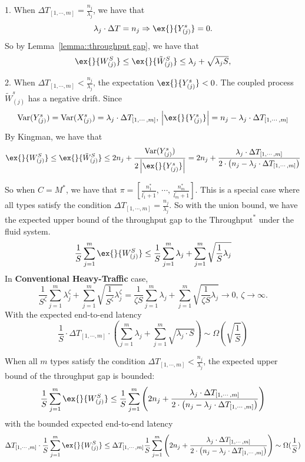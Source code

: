 \documentclass[preprint]{article}
\theoremstyle{plain}
\theoremstyle{definition}
\theoremstyle{remark}
\begin{document}
1. When $ \Delta T_{[1,\cdots,m]} = \frac{n_j}{\lambda_j}$, we have that
$$\lambda_j\cdot \Delta T = n_j\Rightarrow \ex{}{Y^s_{(j)}}=0.$$
So by Lemma~\ref{lemma::throughput gap}, we have that
$$\ex{}{W^S_{(j)}}\leq \ex{}{\tilde{W}^S_{(j)}}\leq \lambda_j + \sqrt{\lambda_j S}, $$

2. When $\Delta T_{[1,\cdots,m]} < \frac{n_j}{\lambda_j}$, the expectation $\ex{}{Y^s_{(j)}}<0$. The coupled process $\tilde{W}^s_{(j)}$ has a negative drift. Since
$$\text{Var}(Y^s_{(j)} )= \text{Var}(X^s_{(j)} )  = \lambda_j \cdot \Delta T_{[1,\cdots,m]},\,
\left| \ex{}{Y^s_{(j)}} \right| = n_j - \lambda_j\cdot \Delta T_{[1,\cdots,m]}$$
By Kingman, we have that
$$\ex{}{W^S_{(j)}}\leq \ex{}{\tilde{W}^S_{(j)}}\leq 2n_j + \frac{\text{Var}(Y^s_{(j)} )}{2\left| \ex{}{Y^s_{(j)}} \right| } =2n_j+ \frac{\lambda_j \cdot \Delta T_{[1,\cdots,m]}}{2\cdot\left(n_j - \lambda_j\cdot \Delta T_{[1,\cdots,m]}\right)}$$

So when $C = M^*$, we have that $\pi = [\frac{n_1^*}{l_1^\prime+1},\,\cdots,\, \frac{n_m^*}{l_m^\prime+1}]$. This is a special case where all types satisfy the condition $\Delta T_{[1,\cdots,m]} = \frac{n_j}{\lambda_j}$. So with the union bound, we have the expected upper bound of the throughput gap to the $\text{Throughput}^*$ under the fluid system.
$$\frac{1}{S}\sum_{j=1}^m \ex{}{W^S_{(j)}}\leq \frac{1}{S}\sum_{j=1}^m \lambda_j +\sum_{j=1}^m \sqrt{\frac{1}{S}\lambda_j} $$
In \textbf{Conventional Heavy-Traffic} case,
$$\frac{1}{S^{\zeta }}\sum_{j=1}^m \lambda_j^{\zeta } +\sum_{j=1}^m \sqrt{\frac{1}{S^{\zeta }}\lambda_j^{\zeta }}  =\frac{1}{\zeta S}\sum_{j=1}^m \lambda_j +\sum_{j=1}^m \sqrt{\frac{1}{\zeta S}\lambda_j} \to 0, \,\zeta \to \infty.$$
With the expected end-to-end latency
$$\frac{1}{S}\cdot\Delta T_{[1,\cdots,m]} \cdot \left(\sum_{j=1}^m \lambda_j +\sum_{j=1}^m \sqrt{\lambda_j\cdot S} \right) \sim \Omega(\sqrt{\frac{1}{S}})$$

When all $m$ types satisfy the condition $\Delta T_{[1,\cdots,m]} < \frac{n_j}{\lambda_j}$, the expected upper bound of the throughput gap is bounded:
$$\frac{1}{S}\sum_{j=1}^m \ex{}{W^S_{(j)}}\leq \frac{1}{S}  \sum_{j=1}^m \left(2n_j+ \frac{\lambda_j \cdot \Delta T_{[1,\cdots,m]}}{2\cdot\left(n_j - \lambda_j\cdot \Delta T_{[1,\cdots,m]}\right)}\right) $$
with the bounded expected end-to-end latency
$$ \Delta T_{[1,\cdots,m]} \cdot\frac{1}{S}\sum_{j=1}^m \ex{}{W^S_{(j)}}\leq \Delta T_{[1,\cdots,m]}\frac{1}{S}  \sum_{j=1}^m \left(2n_j+ \frac{\lambda_j \cdot \Delta T_{[1,\cdots,m]}}{2\cdot\left(n_j - \lambda_j\cdot \Delta T_{[1,\cdots,m]}\right)}\right) \sim \Omega(\frac{1}{S})$$
\end{document}
